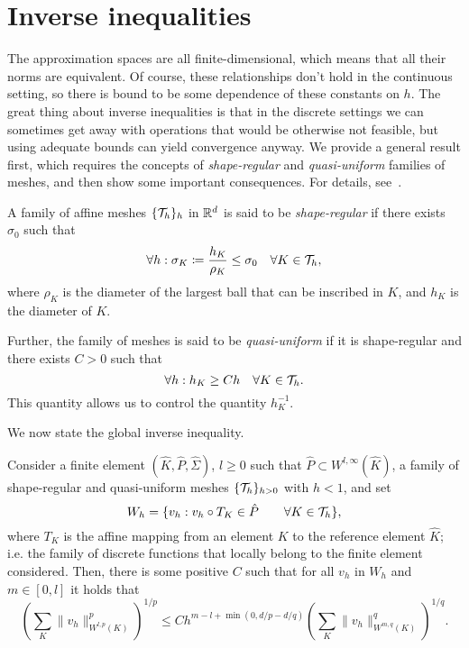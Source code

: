 \section{Inverse inequalities}\label{thm:inverse-inequalities}
The approximation spaces are all finite-dimensional, which means that all their norms are equivalent. Of course, these relationships don't hold in the continuous setting, so there is bound to be some dependence of these constants on $h$. The great thing about inverse inequalities is that in the discrete settings we can sometimes get away with operations that would be otherwise not feasible, but using adequate bounds can yield convergence anyway. We provide a general result first, which requires the concepts of \emph{shape-regular} and \emph{quasi-uniform} families of meshes, and then show some important consequences. For details, see~\cite{ern2004theory}.
\begin{definition}
    A family of affine meshes $\{\mathcal{T}_h\}_h$ in $\mathbb{R}^d$ is said to be \emph{shape-regular} if there exists $\sigma_0$ such that 
    \begin{equation}
        \forall h: \sigma_K\coloneqq \frac{h_K}{\rho_K} \leq \sigma_0 \quad\forall K\in \mathcal{T}_h,
    \end{equation}
    where $\rho_K$ is the diameter of the largest ball that can be inscribed in $K$, and $h_K$ is the diameter of $K$.

    Further, the family of meshes is said to be \emph{quasi-uniform} if it is shape-regular and there exists $C>0$ such that
    \begin{equation}\label{eq:def-quasi-uniform}
        \forall h: h_K \geq C h \quad \forall K\in \mathcal{T}_h.
    \end{equation}
    This quantity allows us to control the quantity $h_K^{-1}$. 
\end{definition}

We now state the global inverse inequality.
\begin{theorem}\label{thm:global-inverse-inequality}
    Consider a finite element $(\hat K, \hat P, \hat \Sigma)$, $l\geq 0$ such that $\hat P\subset W^{l,\infty}(\hat K)$, a family of shape-regular and quasi-uniform meshes $\{\mathcal{T}_h\}_{h>0}$ with $h<1$, and set
    \begin{equation}
        W_h = \{v_h: v_h\circ T_K \in \hat P \qquad\forall K\in \mathcal{T}_h \},
    \end{equation}
    where $T_K$ is the affine mapping from an element $K$ to the reference element $\hat K$; i.e. the family of discrete functions that locally belong to the finite element considered. Then, there is some positive $C$ such that for all $v_h$ in $W_h$ and $m\in [0,l]$ it holds that
    \begin{equation}\label{eq:global-inverse-inequality}
        \left(\sum_K \| v_h\|^p_{W^{l,p}(K)}\right)^{1/p} \leq Ch^{m-l+\min(0, d/p - d/q)} \left(\sum_K \|v_h\|_{W^{m,q}(K)}^q\right)^{1/q}.
    \end{equation}
\end{theorem}

